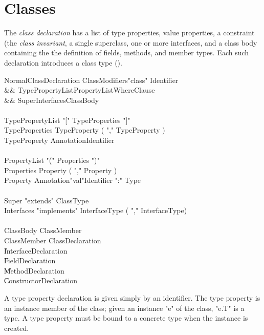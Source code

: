 \chapter{Classes}
\label{XtenClasses}

The {\em class declaration} has
a list of type properties, value properties, 
a  constraint (the {\em class invariant}, a single superclass,
one or more interfaces, and a class body containing the
the definition of
fields, methods, and member types.
Each such declaration introduces a class
type ().

\begin{grammar}
NormalClassDeclaration \:
      ClassModifiers\opt \xcd"class" Identifier  \\
   && TypePropertyList\opt PropertyList\opt WhereClause\opt \\
   && Super\opt Interfaces\opt ClassBody \\
\\
TypePropertyList     \:  \xcd"[" TypeProperties \xcd"]" \\
TypeProperties       \:  TypeProperty ( \xcd"," TypeProperty )\star \\
TypeProperty         \:  Annotation\star Identifier     \\
\\
PropertyList     \:  \xcd"(" Properties \xcd")" \\
Properties       \:  Property ( \xcd"," Property )\star \\
Property         \:  Annotation\star \xcd"val"\opt Identifier \xcd":" Type \\
\\
Super \: \xcd"extends" ClassType \\
Interfaces \: \xcd"implements" InterfaceType ( \xcd"," InterfaceType)\star \\
\\
ClassBody \: ClassMember\star \\
ClassMember \: ClassDeclaration \\
            \| InterfaceDeclaration \\
            \| FieldDeclaration \\
            \| MethodDeclaration \\
            \| ConstructorDeclaration \\
\end{grammar}

A type property declaration is given simply by an identifier.
The type property is an instance member of the class; given
an instance \xcd"e" of the class, \xcd"e.T" is a type.
A type property must be
bound to a concrete type when the instance is created.

